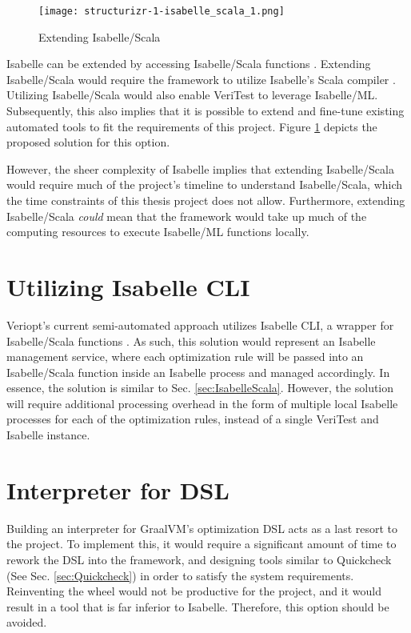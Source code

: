 \begin{figure}[h]
      \centering
      \texttt{[image: structurizr-1-isabelle\_scala\_1.png]}
      \caption{Extending Isabelle/Scala}
      \label{fig:IsabelleScala}
\end{figure}

Isabelle can be extended by accessing Isabelle/Scala functions \cite[Ch. 5]{isabelleSystem}. Extending Isabelle/Scala would require the framework 
to utilize Isabelle's Scala compiler \cite[Sec. 5.1.4]{isabelleSystem}. Utilizing Isabelle/Scala would also enable VeriTest to leverage Isabelle/ML. 
Subsequently, this also implies that it is possible to extend and fine-tune existing automated tools to fit the 
requirements of this project. Figure \ref{fig:IsabelleScala} depicts the proposed solution for this option.

However, the sheer complexity of Isabelle implies that extending Isabelle/Scala would require much of the 
project's timeline to understand Isabelle/Scala, which the time constraints of this thesis project does not allow. 
Furthermore, extending Isabelle/Scala \emph{could} mean that the framework would take up much of the computing resources to execute 
Isabelle/ML functions locally.

\section{Utilizing Isabelle CLI}
\label{sec:IsabelleCLI}

Veriopt's current semi-automated approach \cite[Sec. 5.1]{Term_Graph_Optimizations} utilizes Isabelle CLI, a wrapper for Isabelle/Scala functions 
\cite{IsabelleHOL}. As such, this solution would represent an Isabelle management service, where each optimization rule will be passed into an 
Isabelle/Scala function inside an Isabelle process and managed accordingly. In essence, the solution is similar to Sec. \ref{sec:IsabelleScala}. 
However, the solution will require additional processing overhead in the form of multiple local Isabelle processes for each of the optimization rules, 
instead of a single VeriTest and Isabelle instance.

\section{Interpreter for DSL}
\label{sec:DSLInterpreter}

Building an interpreter for GraalVM's optimization DSL acts as a last resort to the project. To implement this, it would require a significant 
amount of time to rework the DSL into the framework, and designing tools similar to Quickcheck (See Sec. \ref{sec:Quickcheck}) in order to satisfy the 
system requirements. Reinventing the wheel would not be productive for the project, and it would result in a tool that is far inferior to Isabelle.
Therefore, this option should be avoided.
